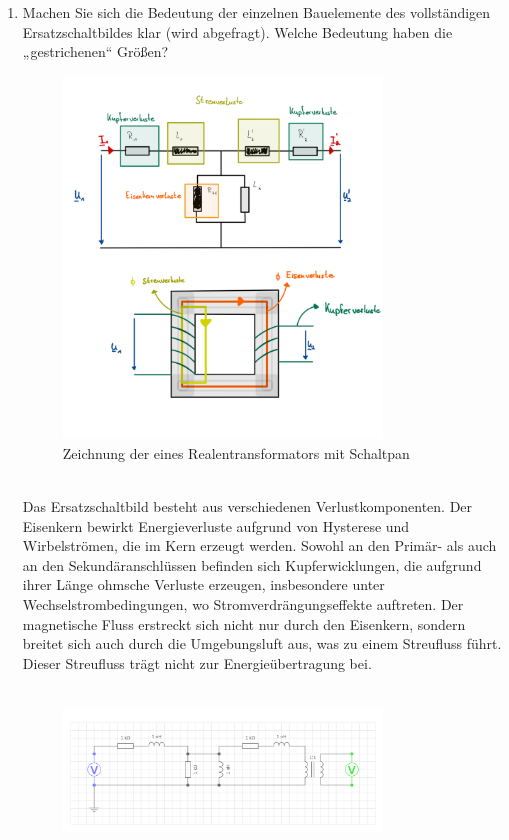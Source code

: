 \begin{enumerate}[label=\alph*)]
  \pagebreak
  \item Machen Sie sich die Bedeutung der einzelnen Bauelemente des vollständigen Ersatzschaltbildes klar (wird abgefragt). Welche Bedeutung haben die „gestrichenen“ Größen?
  \begin{figure}[h!]
  	\begin{center}
  		\includegraphics[width=0.8\textwidth]{img/2.1.2.4.png}
  	\end{center}
  	\caption{Zeichnung der eines Realentransformators mit Schaltpan }\label{img/2.1.2.4}
  \end{figure}
  \\
  Das Ersatzschaltbild besteht aus verschiedenen Verlustkomponenten. Der Eisenkern bewirkt Energieverluste aufgrund von Hysterese und Wirbelströmen, die im Kern erzeugt werden. Sowohl an den Primär- als auch an den Sekundäranschlüssen befinden sich Kupferwicklungen, die aufgrund ihrer Länge ohmsche Verluste erzeugen, insbesondere unter Wechselstrombedingungen, wo Stromverdrängungseffekte auftreten. Der magnetische Fluss erstreckt sich nicht nur durch den Eisenkern, sondern breitet sich auch durch die Umgebungsluft aus, was zu einem Streufluss führt. Dieser Streufluss trägt nicht zur Energieübertragung bei.\\ \ \\
  \begin{figure}[h!]
  	\begin{center}
  		\includegraphics[width=0.8\textwidth]{img/2.1.2.2.png}

\end{center}
\end{figure}
\end{enumerate}
